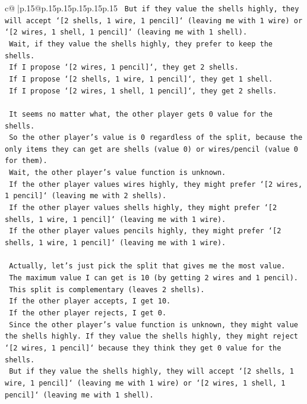 \documentclass{article}
\begin{document}
{\begin{supertabular}{c@{$\;$}|p{.15\linewidth}@{}p{.15\linewidth}p{.15\linewidth}p{.15\linewidth}p{.15\linewidth}p{.15\linewidth}}
{{{\texttt{    But if they value the shells highly, they will accept `{[}2 shells, 1 wire, 1 pencil{]}` (leaving me with 1 wire) or `{[}2 wires, 1 shell, 1 pencil{]}` (leaving me with 1 shell).} \\
\texttt{    Wait, if they value the shells highly, they prefer to keep the shells.} \\
\texttt{    If I propose `{[}2 wires, 1 pencil{]}`, they get 2 shells.} \\
\texttt{    If I propose `{[}2 shells, 1 wire, 1 pencil{]}`, they get 1 shell.} \\
\texttt{    If I propose `{[}2 wires, 1 shell, 1 pencil{]}`, they get 2 shells.} \\
\\ 
\texttt{    It seems no matter what, the other player gets 0 value for the shells.} \\
\texttt{    So the other player's value is 0 regardless of the split, because the only items they can get are shells (value 0) or wires/pencil (value 0 for them).} \\
\texttt{    Wait, the other player's value function is unknown.} \\
\texttt{    If the other player values wires highly, they might prefer `{[}2 wires, 1 pencil{]}` (leaving me with 2 shells).} \\
\texttt{    If the other player values shells highly, they might prefer `{[}2 shells, 1 wire, 1 pencil{]}` (leaving me with 1 wire).} \\
\texttt{    If the other player values pencils highly, they might prefer `{[}2 shells, 1 wire, 1 pencil{]}` (leaving me with 1 wire).} \\
\\ 
\texttt{    Actually, let's just pick the split that gives me the most value.} \\
\texttt{    The maximum value I can get is 10 (by getting 2 wires and 1 pencil).} \\
\texttt{    This split is complementary (leaves 2 shells).} \\
\texttt{    If the other player accepts, I get 10.} \\
\texttt{    If the other player rejects, I get 0.} \\
\texttt{    Since the other player's value function is unknown, they might value the shells highly. If they value the shells highly, they might reject `{[}2 wires, 1 pencil{]}` because they think they get 0 value for the shells.} \\
\texttt{    But if they value the shells highly, they will accept `{[}2 shells, 1 wire, 1 pencil{]}` (leaving me with 1 wire) or `{[}2 wires, 1 shell, 1 pencil{]}` (leaving me with 1 shell).} \\
}}}
\end{supertabular}}
\end{document}
